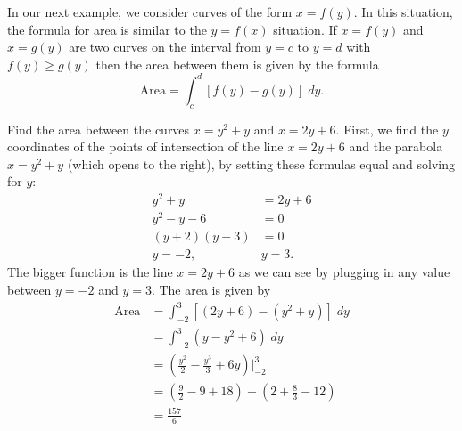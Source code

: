 \documentclass{ximera}
\begin{document}
In our next example, we consider curves of the form $x = f(y)$. In this situation, the formula for area is similar to the $y = f(x)$ situation.
If $x = f(y)$ and $x=g(y)$ are two curves on the interval from $y = c$ to $y = d$ with $f(y) \geq g(y)$
then the area between them is given by the formula
\[
\text{Area} = \int_c^d [f(y) - g(y)] \; dy.
\]
\begin{example}
Find the area between the curves $x = y^2 + y$ and $x = 2y + 6$.
First, we find the $y$ coordinates of the points of intersection of the line $x = 2y+6$ 
and the parabola $x=y^2 + y$ (which opens to the right), by setting these formulas equal and solving for $y$:
\begin{align*}
y^2 + y &= 2y + 6 \\
y^2 - y - 6 &= 0 \\
(y+2)(y-3) &= 0 \\
y = -2, & y = 3.
\end{align*}
The bigger function is the line $x = 2y+6$ as we can see by plugging in any value between $y = -2$ and $y=3$.
The area is given by
\begin{align*}
\text{Area} &= \int_{-2}^3 \left[(2y+6) - (y^2+y) \right] \; dy \\
            &= \int_{-2}^3 \left(y - y^2 + 6\right) \; dy \\
            &= \left(\frac{y^2}{2} - \frac{y^3}{3} + 6y \right) \bigg|_{-2}^{3} \\
            &= \left(\tfrac92 - 9 + 18\right) - \left(2 + \tfrac83 - 12\right)\\
            &= \tfrac{157}{6}         
\end{align*}


\begin{center}
\end{center}
\end{example}
\end{document}
